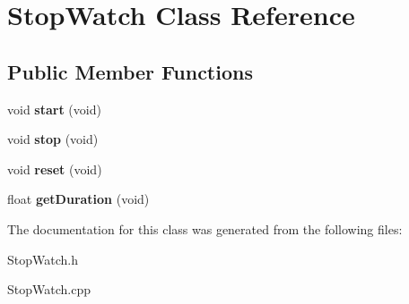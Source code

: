 \hypertarget{class_stop_watch}{
\section{StopWatch Class Reference}
\label{class_stop_watch}
}
\subsection*{Public Member Functions}
\begin{DoxyCompactItemize}
\item 
\hypertarget{class_stop_watch_aa4d4a097a02e4d492ee8e11c1f203c37}{
void {\bfseries start} (void)}
\label{class_stop_watch_aa4d4a097a02e4d492ee8e11c1f203c37}

\item 
\hypertarget{class_stop_watch_a8603b2fc2934a372f02758d43a9b3695}{
void {\bfseries stop} (void)}
\label{class_stop_watch_a8603b2fc2934a372f02758d43a9b3695}

\item 
\hypertarget{class_stop_watch_ac62dd60ba609fdd6559e2cc4b5ebd076}{
void {\bfseries reset} (void)}
\label{class_stop_watch_ac62dd60ba609fdd6559e2cc4b5ebd076}

\item 
\hypertarget{class_stop_watch_a30f893709a103d6230a0f8778766b4f8}{
float {\bfseries getDuration} (void)}
\label{class_stop_watch_a30f893709a103d6230a0f8778766b4f8}

\end{DoxyCompactItemize}


The documentation for this class was generated from the following files:\begin{DoxyCompactItemize}
\item 
StopWatch.h\item 
StopWatch.cpp\end{DoxyCompactItemize}
